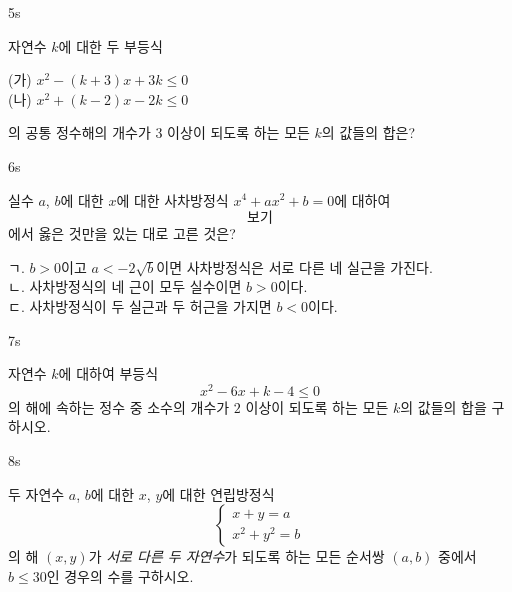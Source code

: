 \documentclass[10pt]{article}
\begin{document}
\begin{pagepair}

\begin{problem}{5}{s}
\par\smallskip
자연수 $k$에 대한 두 부등식
\begin{conditions}
(가) $x^2 - (k + 3)x + 3k \le 0$ \\
(나) $x^2 + (k - 2)x - 2k \le 0$
\end{conditions}
의 공통 정수해의 개수가 $3$ 이상이 되도록 하는 모든 $k$의 값들의 합은?
\begin{choices}
\end{choices}
\end{problem}

\begin{problem}{6}{s}
\par\smallskip
실수 $a$, $b$에 대한 $x$에 대한 사차방정식 $x^4 + ax^2 + b = 0$에 대하여 \[보기\]에서 옳은 것만을 있는 대로 고른 것은?
\begin{conditions}
ㄱ. $b > 0$이고 $a < -2\sqrt{b}$이면 사차방정식은 서로 다른 네 실근을 가진다. \\
ㄴ. 사차방정식의 네 근이 모두 실수이면 $b > 0$이다. \\
ㄷ. 사차방정식이 두 실근과 두 허근을 가지면 $b < 0$이다.
\end{conditions}
\begin{choices}
\end{choices}
\end{problem}

\end{pagepair}


\begin{pagepair}

\begin{problem}{7}{s}
\par\smallskip
자연수 $k$에 대하여 부등식
$$x^2 - 6x + k - 4 \le 0$$
의 해에 속하는 정수 중 소수의 개수가 $2$ 이상이 되도록 하는 모든 $k$의 값들의 합을 구하시오.
\end{problem}

\begin{problem}{8}{s}
\par\smallskip
두 자연수 $a$, $b$에 대한 $x$, $y$에 대한 연립방정식
$$\begin{cases} x + y = a \\ x^2 + y^2 = b \end{cases}$$
의 해 $(x, y)$가 \emph{서로 다른 두 자연수}가 되도록 하는 모든 순서쌍 $(a, b)$ 중에서 $b \le 30$인 경우의 수를 구하시오.
\end{problem}

\end{pagepair}
\end{document}
